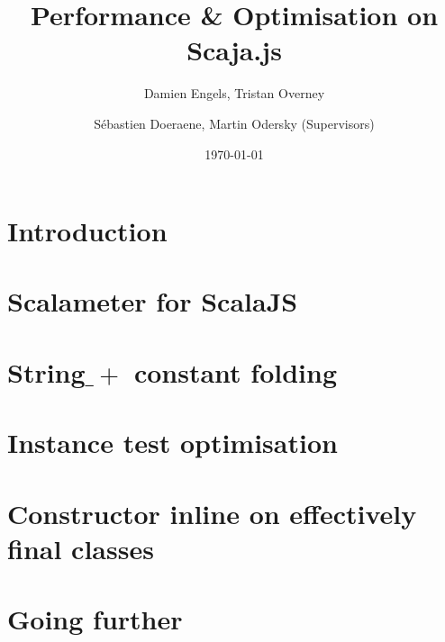 \documentclass{report}
\begin{document}
\title{Performance \& Optimisation on Scaja.js}
\author{Damien Engels, Tristan Overney\and S\'{e}bastien Doeraene, Martin Odersky (Supervisors)}
\date{\today}
\maketitle

\chapter{Introduction}


\chapter{Scalameter for ScalaJS}


\chapter{String$\_+$ constant folding}


\chapter{Instance test optimisation}


\chapter{Constructor inline on effectively final classes}


\chapter{Going further}

\end{document}
